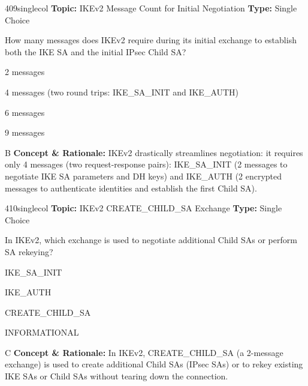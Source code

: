 \begin{qcard}{409}{singlecol}
\textcolor{darkslate!75}{\small\textbf{Topic:} IKEv2 Message Count for Initial Negotiation \hfill \textbf{Type:} Single Choice}\vspace{0.4em}\par
How many messages does IKEv2 require during its initial exchange to establish both the IKE SA and the initial IPsec Child SA?
\begin{qoptions}
\item 2 messages
\item 4 messages (two round trips: IKE\_SA\_INIT and IKE\_AUTH)
\item 6 messages
\item 9 messages
\end{qoptions}
\end{qcard}
\nopagebreak
\begin{explainbox}{B}
\textbf{Concept \& Rationale:} IKEv2 drastically streamlines negotiation: it requires only 4 messages (two request-response pairs): IKE\_SA\_INIT (2 messages to negotiate IKE SA parameters and DH keys) and IKE\_AUTH (2 encrypted messages to authenticate identities and establish the first Child SA).
\end{explainbox}

\begin{qcard}{410}{singlecol}
\textcolor{darkslate!75}{\small\textbf{Topic:} IKEv2 CREATE\_CHILD\_SA Exchange \hfill \textbf{Type:} Single Choice}\vspace{0.4em}\par
In IKEv2, which exchange is used to negotiate additional Child SAs or perform SA rekeying?
\begin{qoptions}
\item IKE\_SA\_INIT
\item IKE\_AUTH
\item CREATE\_CHILD\_SA
\item INFORMATIONAL
\end{qoptions}
\end{qcard}
\nopagebreak
\begin{explainbox}{C}
\textbf{Concept \& Rationale:} In IKEv2, CREATE\_CHILD\_SA (a 2-message exchange) is used to create additional Child SAs (IPsec SAs) or to rekey existing IKE SAs or Child SAs without tearing down the connection.
\end{explainbox}

